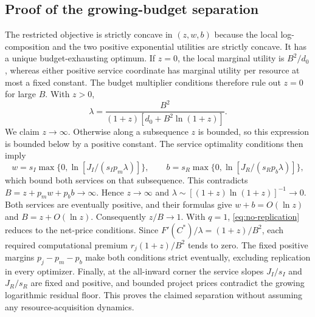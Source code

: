 \documentclass[11pt,a4paper]{article}
\theoremstyle{definition}\newtheorem{definition}{Definition}
\begin{document}
\subsection{Proof of the growing-budget separation}
\label{app:growing-norep-proof}
The restricted objective is strictly concave in $(z,w,b)$ because the
local log-composition and the two positive exponential utilities are
strictly concave. It has a unique budget-exhausting optimum. If $z=0$,
the local marginal utility is $B^2/d_0$, whereas either positive service
coordinate has marginal utility per resource at most a fixed constant.
The budget multiplier conditions therefore rule out $z=0$ for large $B$.
With $z>0$,
\[
 \lambda=\frac{B^2}{(1+z)[d_0+B^2\ln(1+z)]}.
\]
We claim $z\to\infty$. Otherwise along a subsequence $z$ is bounded,
so this expression is bounded below by a positive constant. The service
optimality conditions then imply
\[
 w=s_I\max\{0,\ln[J_I/(s_Ip_m\lambda)]\},\qquad
 b=s_R\max\{0,\ln[J_R/(s_Rp_b\lambda)]\},
\]
which bound both services on that subsequence. This contradicts
$B=z+p_mw+p_bb\to\infty$. Hence $z\to\infty$ and
$\lambda\sim[(1+z)\ln(1+z)]^{-1}\to0$. Both services are eventually
positive, and their formulas give $w+b=O(\ln z)$ and
$B=z+O(\ln z)$. Consequently $z/B\to1$.
With $q=1$, \cref{eq:no-replication} reduces to the net-price conditions.
Since $F'(C^*)/\lambda=(1+z)/B^2$, each required computational premium
$r_j(1+z)/B^2$ tends to zero. The fixed positive margins
$p_j-p_m-p_b$ make both conditions strict eventually, excluding replication
in every optimizer. Finally, at the all-inward corner the service slopes
$J_I/s_I$ and $J_R/s_R$ are fixed and positive, and bounded project prices
contradict the growing logarithmic residual floor. This proves the
claimed separation without assuming any resource-acquisition dynamics.
\end{document}
